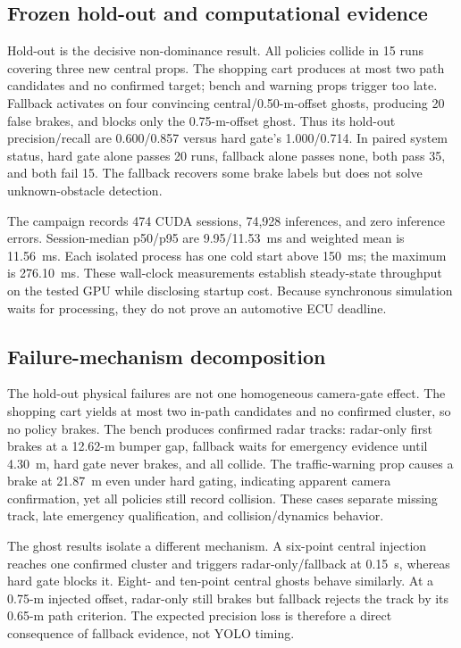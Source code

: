 \documentclass[conference]{IEEEtran}
\begin{document}
\subsection{Frozen hold-out and computational evidence}
Hold-out is the decisive non-dominance result. All policies collide in 15 runs
covering three new central props. The shopping cart produces at most two path
candidates and no confirmed target; bench and warning props trigger too late.
Fallback activates on four convincing central/0.50-m-offset ghosts, producing
20 false brakes, and blocks only the 0.75-m-offset ghost. Thus its hold-out
precision/recall are 0.600/0.857 versus hard gate's 1.000/0.714. In paired system
status, hard gate alone passes 20 runs, fallback alone passes none, both pass 35,
and both fail 15. The fallback recovers some brake labels but does not solve
unknown-obstacle detection.

The campaign records 474 CUDA sessions, 74,928 inferences, and zero inference
errors. Session-median p50/p95 are 9.95/11.53~ms and weighted mean is 11.56~ms.
Each isolated process has one cold start above 150~ms; the maximum is 276.10~ms.
These wall-clock measurements establish steady-state throughput on the tested
GPU while disclosing startup cost. Because synchronous simulation waits for
processing, they do not prove an automotive ECU deadline.

\subsection{Failure-mechanism decomposition}
The hold-out physical failures are not one homogeneous camera-gate effect. The
shopping cart yields at most two in-path candidates and no confirmed cluster,
so no policy brakes. The bench produces confirmed radar tracks: radar-only first
brakes at a 12.62-m bumper gap, fallback waits for emergency evidence until
4.30~m, hard gate never brakes, and all collide. The traffic-warning prop causes
a brake at 21.87~m even under hard gating, indicating apparent camera
confirmation, yet all policies still record collision. These cases separate
missing track, late emergency qualification, and collision/dynamics behavior.

The ghost results isolate a different mechanism. A six-point central injection
reaches one confirmed cluster and triggers radar-only/fallback at 0.15~s, whereas
hard gate blocks it. Eight- and ten-point central ghosts behave similarly. At a
0.75-m injected offset, radar-only still brakes but fallback rejects the track by
its 0.65-m path criterion. The expected precision loss is therefore a direct
consequence of fallback evidence, not YOLO timing.
\end{document}
